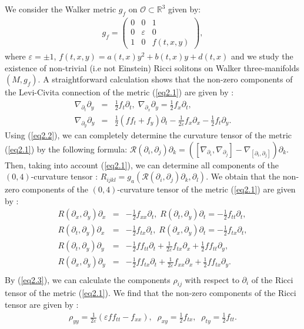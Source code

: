 \documentclass[reqno, 12pt]{amsart}
\numberwithin{equation}{section}
\begin{document}
We consider the Walker metric  $g_{f}$ on $\mathcal{O} \subset \mathbb{R}^3$ 
given by:
\begin{eqnarray}\label{eq2.1} 
g _f= \left( \begin{array}{cccc}
0&0&1\\
0&\varepsilon&0\\
1&0&f(t,x,y)
\end{array}
\right),
\end{eqnarray}
where $\varepsilon=\pm 1$, $f(t,x,y) = a(t,x)y^2 +b(t,x) y + d(t,x)$ and we study 
the existence of non-trivial (i.e not Einstein) Ricci solitons on Walker three-manifolds
$(M, g _f)$. A straightforward calculation shows that the non-zero components  
of the Levi-Civita connection of the metric (\ref{eq2.1}) are given by :
\begin{eqnarray}\label{eq2.2}
\nabla_{\partial_t}\partial_y &=& \frac{1}{2} f_t \partial_t, \; 
\nabla_{\partial_x}\partial_y = \frac{1}{2} f_x \partial_t, \;
 \nonumber \\
\nabla_{\partial_y}\partial_y &=& \frac{1}{2} \left( ff_t  + f_y\right)  
\partial_t 
 - \frac{1}{2\varepsilon} f_x\partial_x 
- \frac{1}{2} f_t\partial_y.
\end{eqnarray}   
Using (\ref{eq2.2}), we can completely determine the curvature tensor
of the metric (\ref{eq2.1}) by the following formula:
$\mathcal{R}(\partial_i, \partial_j)\partial_k = ([\nabla_{\partial_i}, 
\nabla_{\partial_j}]  - \nabla_{[\partial_i, \partial_j]}) \partial_k$. Then, 
taking into account (\ref{eq2.1}), we can determine all components 
of the $(0,4)$-curvature tensor : 
$R_{ijkl}=g_{a}(\mathcal{R}(\partial_i,\partial_j)\partial_k, \partial_l)$. 
We obtain that the non-zero components of the $(0,4)$-curvature tensor 
of the metric (\ref{eq2.1}) are given by :
\begin{eqnarray}\label{eq2.3}
R(\partial_x,\partial_y)\partial_x&=& -\frac{1}{2} f_{xx}\partial_t, \;
R(\partial_t,\partial_y)\partial_t =-\frac{1}{2} f_{tt}\partial_t, \nonumber \\
R(\partial_t,\partial_y)\partial_x &=& -\frac{1}{2} f_{tx}\partial_t , \;
R(\partial_x,\partial_y)\partial_t = -\frac{1}{2} f_{tx}\partial_t ,\nonumber \\
R(\partial_t,\partial_y)\partial_y&=& -\frac{1}{2} ff_{tt}\partial_t+\frac{1}{2\varepsilon} f_{tx}\partial_x+\frac{1}{2} ff_{tt}\partial_y ,\nonumber \\
R(\partial_x,\partial_y)\partial_y&=& -\frac{1}{2} ff_{tx}\partial_t+\frac{1}{2\varepsilon} f_{xx}\partial_x+\frac{1}{2} ff_{tx}\partial_y .\nonumber \\
\end{eqnarray}
By (\ref{eq2.3}), we can calculate the components $\rho_{ij}$ with respect 
to $\partial_i$ of the Ricci tensor of the metric (\ref{eq2.1}). We find that the 
non-zero components of the Ricci tensor  are given by :
\begin{eqnarray}\label{eq2.4}
\rho_{yy} = \frac{1}{2\varepsilon} \left(\varepsilon ff_{tt}-f_{xx}\right) , \;\;
\rho_{xy} = \frac{1}{2} f_{tx}, \;\;
\rho_{ty} = \frac{1}{2} f_{tt}.
\end{eqnarray}
\end{document}
